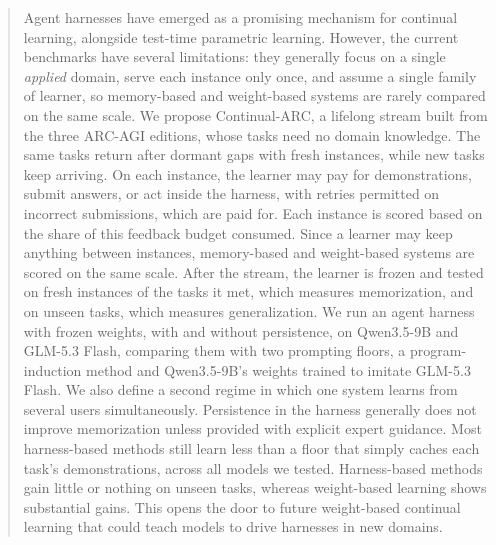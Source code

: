 \begin{abstract}
Agent harnesses have emerged as a promising mechanism for continual learning, alongside test-time parametric learning. However, the current benchmarks have several limitations: they generally focus on a single \emph{applied} domain, serve each instance only once, and assume a single family of learner, so memory-based and weight-based systems are rarely compared on the same scale. We propose Continual-ARC, a lifelong stream built from the three ARC-AGI editions, whose tasks need no domain knowledge. The same tasks return after dormant gaps with fresh instances, while new tasks keep arriving. On each instance, the learner may pay for demonstrations, submit answers, or act inside the harness, with retries permitted on incorrect submissions, which are paid for. Each instance is scored based on the share of this feedback budget consumed. Since a learner may keep anything between instances, memory-based and weight-based systems are scored on the same scale. After the stream, the learner is frozen and tested on fresh instances of the tasks it met, which measures memorization, and on unseen tasks, which measures generalization. We run an agent harness with frozen weights, with and without persistence, on \mbox{Qwen3.5-9B} and \mbox{GLM-5.3} Flash, comparing them with two prompting floors, a program-induction method and \mbox{Qwen3.5-9B}'s weights trained to imitate \mbox{GLM-5.3} Flash. We also define a second regime in which one system learns from several users simultaneously. Persistence in the harness generally does not improve memorization unless provided with explicit expert guidance. Most harness-based methods still learn less than a floor that simply caches each task's demonstrations, across all models we tested. Harness-based methods gain little or nothing on unseen tasks, whereas weight-based learning shows substantial gains. This opens the door to future weight-based continual learning that could teach models to drive harnesses in new domains.
\end{abstract}
